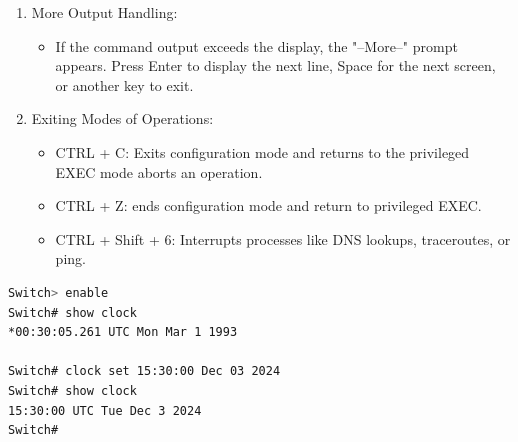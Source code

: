 \documentclass[a4paper,11pt]{article}
\begin{document}
\begin{enumerate}
\begin{itemize}
    \end{itemize}
    \item More Output Handling:\\
    \begin{itemize}
        \item If the command output exceeds the display, the "--More--" prompt appears. Press Enter to display the next line, Space for the next screen, or another key to exit.\\ 
    \end{itemize}
    \item Exiting Modes of Operations:\\
    \begin{itemize}
        \item CTRL + C: Exits configuration mode and returns to the privileged EXEC mode aborts an operation.\\
        \item CTRL + Z: ends configuration mode and return to privileged EXEC.\\
        \item CTRL + Shift + 6: Interrupts processes like DNS lookups, traceroutes, or ping.\\
    \end{itemize}
\end{enumerate}

\begin{tcolorbox}[colframe=blue!80, colback=blue!20, coltitle=black, title= Scenario: set up the clock]
\begin{lstlisting}[language=bash, caption={Clock Configuration on a Cisco Device}]
Switch> enable
Switch# show clock
*00:30:05.261 UTC Mon Mar 1 1993

Switch# clock set 15:30:00 Dec 03 2024
Switch# show clock
15:30:00 UTC Tue Dec 3 2024
Switch#
\end{lstlisting}
\end{tcolorbox}
\end{document}
